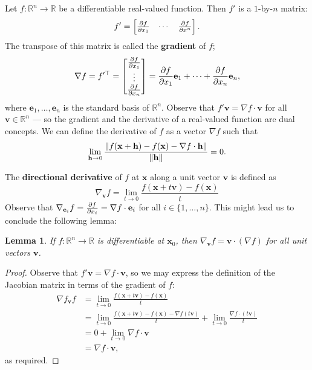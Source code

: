 \documentclass[11pt]{article}
\newtheorem*{lemma*}{Lemma}
\renewcommand{\vec}[1]{\mathbf{#1}}
\renewcommand{\grad}{\nabla}
\begin{document}
Let $f : \mathbb{R}^{n} \to \mathbb{R}$ be a differentiable real-valued function. Then $f'$ is a $1$-by-$n$ matrix:
\[
	f' = \begin{bmatrix} \pdv{f}{x_{1}} & \cdots & \pdv{f}{x^{n}} \end{bmatrix}.
\]
The transpose of this matrix is called the \textbf{gradient} of $f$;
\[
	\grad f = f'^{\top} = \begin{bmatrix} \pdv{f}{x_{1}} \\ \vdots \\ \pdv{f}{x_{n}} \end{bmatrix} = \pdv{f}{x_{1}} \vec{e}_{1} + \cdots + \pdv{f}{x_{n}} \vec{e}_{n},
\]
where $\vec{e}_{1}, \ldots, \vec{e}_{n}$ is the standard basis of $\mathbb{R}^{n}$. Observe that $f' \vec{v} = \grad f \cdot \vec{v}$ for all $\vec{v} \in \mathbb{R}^{n}$ --- so the gradient and the derivative of a real-valued function are dual concepts. We can define the derivative of $f$ as a vector $\grad f$ such that 
\[
	\lim\limits_{\vec{h} \to 0} \frac{\norm{f(\vec{x} + \vec{h}) - f(\vec{x}) - \grad f \cdot \vec{h}}}{\norm{\vec{h}}} = 0.
\]

The \textbf{directional derivative} of $f$ at $\vec{x}$ along a unit vector $\vec{v}$ is defined as
\[
	\grad_{\vec{v}} f = \lim\limits_{t \to 0} \frac{f(\vec{x} + t \vec{v}) - f(\vec{x})}{t}
\]
Observe that $\grad_{\vec{e}_{i}} f = \pdv{f}{x_{i}} = \grad f \cdot \vec{e}_{i}$ for all $i \in \{ 1, \ldots, n \}$. This might lead us to conclude the following lemma:
\begin{adjustwidth}{1cm}{}
	\begin{lemma*}
		If $f: \mathbb{R}^{n} \to \mathbb{R}$ is differentiable at $\vec{x}_{0}$, then $\grad_{\vec{v}} f = \vec{v} \cdot (\grad f)$ for all unit vectors $\vec{v}$.
	\end{lemma*}
    \begin{proof}\renewcommand{\qedsymbol}{}
		Observe that $f' \vec{v} = \grad f \cdot \vec{v}$, so we may express the definition of the Jacobian matrix in terms of the gradient of $f$:
		\begin{align*}
			\grad f_{\vec{v}} f &= \lim\limits_{t \to 0} \frac{f(\vec{x} + t \vec{v}) - f(\vec{x})}{t} \\ 
			&= \lim\limits_{t \to 0} \frac{f(\vec{x} + t \vec{v}) - f(\vec{x}) - \grad f (t \vec{v})}{t} + \lim\limits_{t \to 0} \frac{\grad f \cdot (t \vec{v})}{t} \\
			&= 0 + \lim\limits_{t \to 0} \grad f \cdot \vec{v} \\
			&= \grad f \cdot \vec{v},
		\end{align*}
		as required.
	\end{proof}
\end{adjustwidth}
\end{document}
